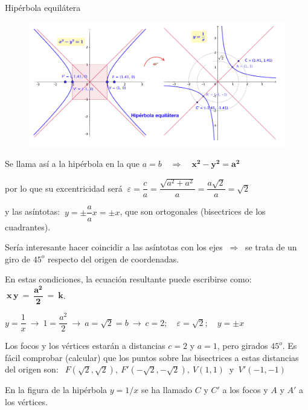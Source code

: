 \vspace{7mm}
\begin{myexampleblock}{Hipérbola equilátera}

\begin{figure}[H]
	\centering
	\includegraphics[width=1\textwidth]{img-conicas/conicas38.png}
	\end{figure}	
	
\vspace{2mm} Se llama así a la hipérbola en la que $a=b \quad \Rightarrow \quad \boldsymbol{x^2-y^2=a^2}$ 

\vspace{2mm} por lo que su excentricidad será $\ \varepsilon=\dfrac c a=\dfrac{\sqrt{a^2+a^2}}{a}=\dfrac{a\sqrt{2}}{a}=\sqrt{2}$

\vspace{2mm} y las asíntotas: $\ y=\pm \dfrac a a x = \pm x$, que son ortogonales (bisectrices de los cuadrantes).

\vspace{2mm} Sería interesante hacer coincidir a las asíntotas con los ejes $\ \Rightarrow \ $ se trata de un giro de $45^o$ respecto del origen de coordenadas.

\vspace{2mm} En estas condiciones, la ecuación resultante puede escribirse como: $\ \boldsymbol{x\, y\ = \ \dfrac {a^2}{2} \ = \ k}$.	

\color{gris}
\vspace{6mm} $y=\dfrac 1 x \ \to \ 1=\dfrac {a^2}{2} \ \to \ a=\sqrt{2}=b \ \to \ c=2;\quad \varepsilon=\sqrt{2};\quad y=\pm x$

\vspace{2mm}  Los focos y los vértices estarán a distancias $c=2$ y $a=1$, pero girados $45^o$. Es fácil comprobar (calcular) que los puntos sobre las bisectrices a estas distancias del origen son: $\ \ F(\sqrt{2},\sqrt{2}),\ F'(-\sqrt{2},-\sqrt{2}),\ V(1,1) \ \text{ y } \ V'(-1,-1)$ 

\vspace{2mm} En la figura de la hipérbola $y=1/x$ se ha llamado $C$ y $C'$ a los focos y $A$ y $A'$ a los vértices.
\color{black}
\vspace{2mm}
\end{myexampleblock}



